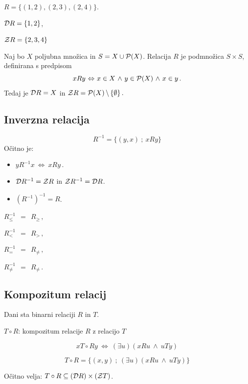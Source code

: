 \documentclass[11pt,paper=b5,footinclude,headinclude]{scrbook} %
\newcounter{example}
\def\inn {{~\wedge~}}
\def\brez {{\,\setminus\,}}
\def\cee {{~\Leftrightarrow~}}
\begin{document}
\medskip

\begin{example*}

$R = \{(1,2), (2,3), (2,4)\}$.

${\cal D}R = \{1,2\}$,

${\cal Z}R = \{2,3,4\}$

\end{example*}

 \begin{example*}
Naj bo $X$ poljubna množica in $S = X\cup {\cal P}(X)$. Relacija $R$ je podmnožica $S\times S$, definirana s predpisom
$$xRy\cee x\in X\inn y\in {\cal P}(X) \inn x\in y\,.$$
Tedaj je ${\cal D}R = X$ in ${\cal Z}R = {\cal P}(X)\brez \{\emptyset\}\,.$
\end{example*}


\subsection{ Inverzna relacija}
$$R^{-1}= \{(y,x)~;~xRy\}$$
Očitno je:
\begin{itemize}
  \item $yR^{-1}x \cee xRy\,.$
  \item ${\cal D}R^{-1} = {\cal Z}R$ in ${\cal Z}R^{-1} = {\cal D}R$.
    \item $(R^{-1})^{-1} = R$.
\end{itemize}


\bigskip
\begin{example*}

 $R_\le^{-1}~~=~~R_\ge\,,$

 $R_<^{-1}~~=~~R_>\,,$

 $R_=^{-1}~~=~~R_{\neq}\,,$


$R_{\neq}^{-1}~~=~~R_{\neq}\,.$\end{example*}


\subsection{Kompozitum relacij}

Dani sta binarni relaciji $R$ in $T$.

$T\circ R$: kompozitum relacije $R$ z relacijo $T$

$$x T\circ R y \cee (\exists u)(xRu\inn uTy)$$

$$T\circ R = \{(x,y)~;~(\exists u)(xRu\inn uTy)\}$$

Očitno velja: $T\circ R\subseteq ({\cal D}R)\times ({\cal Z}T)$.
\end{document}
